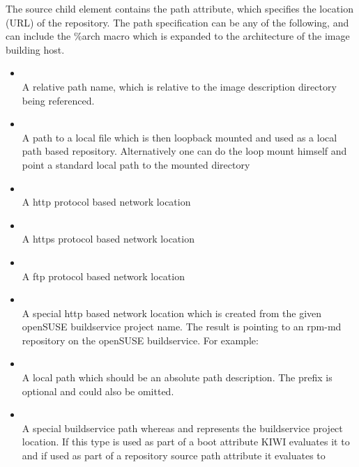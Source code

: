 The source child element contains the path attribute, which specifies
the location (URL) of the repository. The path specification can be any
of the following, and can include the \%arch macro which is expanded
to the architecture of the image building host.

\begin{itemize}
\item {}\\
      A relative path name, which is relative to the image
      description directory being referenced.
\item {}\\
      A path to a local  file which is then loopback mounted
      and used as a local path based repository. Alternatively one
      can do the loop mount himself and point a standard local path
      to the mounted directory
\item {}\\
      A http protocol based network location
\item {}\\
      A https protocol based network location
\item {}\\
      A ftp protocol based network location
\item {}\\
      A special http based network location which is created from
      the given openSUSE buildservice project name. The result is
      pointing to an rpm-md repository on the openSUSE buildservice.
      For example: %
\item {}\\
      A local path which should be an absolute path description.
      The  prefix is optional and could also be omitted.
\item {}\\
      A special buildservice path whereas  and 
      represents the buildservice project location. If this type is
      used as part of a boot attribute KIWI evaluates it to
       and if used as part of a repository
      source path attribute it evaluates to 
\end{itemize}


